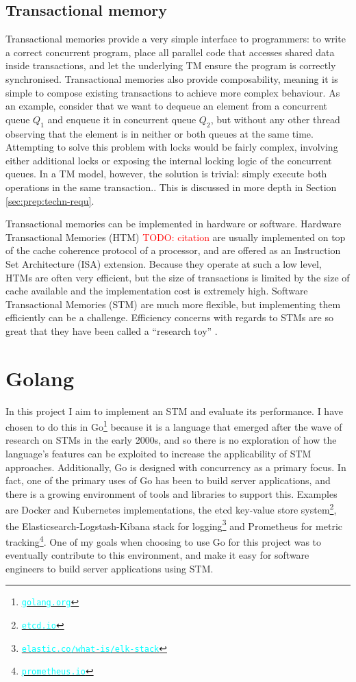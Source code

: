 \documentclass[12pt,a4paper,oneside,openright]{report}
\newcommand{\URL}[1]{\href{https://#1}{\textcolor{cyan}{\texttt{#1}}}}
\newcommand{\todo}[1]{\textcolor{red}{TODO: #1}}
\begin{document}
\subsection{Transactional memory}
\label{sec:transactional-memory}

Transactional memories provide a very simple interface to programmers:
to write a correct concurrent program, place all parallel code that
accesses shared data inside transactions, and let the underlying TM
ensure the program is correctly synchronised. Transactional memories
also provide composability, meaning it is simple to compose existing
transactions to achieve more complex behaviour. As an example,
consider that we want to dequeue an element from a concurrent queue
$Q_1$ and enqueue it in concurrent queue $Q_2$, but without any other
thread observing that the element is in neither or both queues at the
same time. Attempting to solve this problem with locks would be fairly
complex, involving either additional locks or exposing the internal
locking logic of the concurrent queues. In a TM model, however, the
solution is trivial: simply execute both operations in the same
transaction.. This is discussed in more depth in Section
\ref{sec:prep:techn-requ}.

Transactional memories can be implemented in hardware or
software. Hardware Transactional Memories (HTM) \todo{citation} are
usually implemented on top of the cache coherence protocol of a
processor, and are offered as an Instruction Set Architecture (ISA)
extension. Because they operate at such a low level, HTMs are often
very efficient, but the size of transactions is limited by the size of
cache available and the implementation cost is extremely
high. Software Transactional Memories (STM) \cite{STM} are much more
flexible, but implementing them efficiently can be a
challenge. Efficiency concerns with regards to STMs are so great that
they have been called a ``research toy'' \cite{Toy}.

\section{Golang}
\label{sec:intro:golang}

In this project I aim to implement an STM and evaluate its
performance. I have chosen to do this in Go\footnote{\URL{golang.org}}
because it is a language that emerged after the wave of research on
STMs in the early 2000s, and so there is no exploration of how the
language's features can be exploited to increase the applicability of
STM approaches. Additionally, Go is designed with concurrency as a
primary focus. In fact, one of the primary uses of Go has been to
build server applications, and there is a growing environment of tools
and libraries to support this. Examples are Docker and Kubernetes
implementations, the etcd key-value store
system\footnote{\URL{etcd.io}}, the Elasticsearch-Logstash-Kibana
stack for logging\footnote{\URL{elastic.co/what-is/elk-stack}} and
Prometheus for metric tracking\footnote{\URL{prometheus.io}}. One of
my goals when choosing to use Go for this project was to eventually
contribute to this environment, and make it easy for software
engineers to build server applications using STM.
\end{document}
